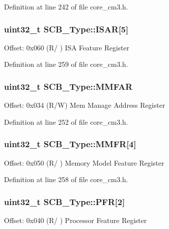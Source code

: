 \-Definition at line 242 of file core\-\_\-cm3.\-h.

\hypertarget{struct_s_c_b___type_acee8e458f054aac964268f4fe647ea4f}{
\subsubsection[{\-I\-S\-A\-R}]{ uint32\-\_\-t {\bf \-S\-C\-B\-\_\-\-Type\-::\-I\-S\-A\-R}\mbox{[}5\mbox{]}}}\label{struct_s_c_b___type_acee8e458f054aac964268f4fe647ea4f}
\-Offset\-: 0x060 (\-R/ ) \-I\-S\-A \-Feature \-Register 

\-Definition at line 259 of file core\-\_\-cm3.\-h.

\hypertarget{struct_s_c_b___type_ac49b24b3f222508464f111772f2c44dd}{
\subsubsection[{\-M\-M\-F\-A\-R}]{ uint32\-\_\-t {\bf \-S\-C\-B\-\_\-\-Type\-::\-M\-M\-F\-A\-R}}}\label{struct_s_c_b___type_ac49b24b3f222508464f111772f2c44dd}
\-Offset\-: 0x034 (\-R/\-W) \-Mem \-Manage \-Address \-Register 

\-Definition at line 252 of file core\-\_\-cm3.\-h.

\hypertarget{struct_s_c_b___type_aec2f8283d2737c6897188568a4214976}{
\subsubsection[{\-M\-M\-F\-R}]{ uint32\-\_\-t {\bf \-S\-C\-B\-\_\-\-Type\-::\-M\-M\-F\-R}\mbox{[}4\mbox{]}}}\label{struct_s_c_b___type_aec2f8283d2737c6897188568a4214976}
\-Offset\-: 0x050 (\-R/ ) \-Memory \-Model \-Feature \-Register 

\-Definition at line 258 of file core\-\_\-cm3.\-h.

\hypertarget{struct_s_c_b___type_a3f51c43f952f3799951d0c54e76b0cb7}{
\subsubsection[{\-P\-F\-R}]{ uint32\-\_\-t {\bf \-S\-C\-B\-\_\-\-Type\-::\-P\-F\-R}\mbox{[}2\mbox{]}}}\label{struct_s_c_b___type_a3f51c43f952f3799951d0c54e76b0cb7}
\-Offset\-: 0x040 (\-R/ ) \-Processor \-Feature \-Register 

